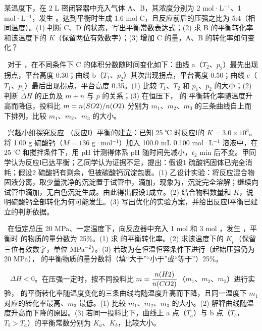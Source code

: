 \begin{xiti}
\item 某温度下，在 2 L 密闭容器中充入气体 A、B，其浓度分别为 2 mol·L$^{-1}$、1 mol·L$^{-1}$，发生 。达到平衡时生成 1.6 mol C，且反应前后的压强之比为 5:4（相同温度）。(1) 判断 C、D 的状态，写出平衡常数表达式；(2) 求 B 的平衡转化率和该温度下的 $K$（保留两位有效数字）；(3) 增加 C 的量，A、B 的转化率如何变化？

\item {}\ 对于 ，在不同条件下 C 的体积分数随时间变化如下：曲线 a（$T_2$、$p_2$）最先出现拐点，平台高度 0.30；曲线 b（$T_1$、$p_2$）其次出现拐点，平台高度 0.50；曲线 c（$T_1$、$p_1$）最后出现拐点，平台高度 0.35。(1) 比较 $T_1$、$T_2$ 和 $p_1$、$p_2$ 的大小；(2) 判断 $\Delta H$ 的正负及 $m+n$ 与 $p$ 的关系；(3) 在恒压下， 的  平衡转化率随温度升高而降低，投料比 $m=n(SO2)/n(O2)$ 分别为 $m_1$、$m_2$、$m_3$ 的三条曲线自上而下排列，比较 $m_1$、$m_2$、$m_3$ 的大小。

\item {}\ 兴趣小组探究反应 （反应Ⅰ）平衡的建立：已知 25 ℃ 时反应Ⅰ的 $K=3.0\times10^3$。将 1.00 g 硫酸钙（$M=136$ g·mol$^{-1}$）加入 100.0 mL 0.100 mol·L$^{-1}$  溶液中，在 25 ℃ 和搅拌条件下，用 pH 计测得体系 pH 随时间先减小，$t_2$ min 后不变。甲同学认为反应Ⅰ已达平衡；乙同学认为证据不足，提出：假设1 硫酸钙固体已完全消耗；假设2 硫酸钙有剩余，但被碳酸钙沉淀包裹。(1) 乙设计实验：将反应混合物固液分离，取少量洗净的沉淀置于试管中，滴加\tk，现象为\tk，沉淀完全溶解；继续向试管中滴加\tk，无白色沉淀生成。由此得出假设1成立。(2) 结合物料数量和 $K$，说明硫酸钙全部转化为何可能发生。(3) 写出优化的实验方案，并给出反应Ⅰ平衡已建立的判断依据。

\item {}\ 在恒定总压 20 MPa、一定温度下，向反应器中充入 1 mol  和 3 mol ，发生 ，平衡时  的物质的量分数为 25\%。(1) 求  的平衡转化率。(2) 求该温度下的 $K_p$（保留三位有效数字，单位 MPa$^{-2}$）。(3) 若改为在恒温恒容条件下进行（起始压强仍为 20 MPa）， 的平衡物质的量分数将\tk（填“大于”“小于”或“等于”）25\%。

\item {}\  $\Delta H<0$。在压强一定时，按不同投料比 $m=\dfrac{n(H2)}{n(CO2)}$（$m_1$、$m_2$、$m_3$）进行实验， 的平衡转化率随温度变化的三条曲线均随温度升高而下降，且同一温度下 $m_1$ 对应的转化率最高、$m_3$ 最低。(1) 比较 $m_1$、$m_2$、$m_3$ 的大小。(2) 解释曲线随温度升高而下降的原因。(3) 若同一投料比下，曲线上 a 点（$T_a$）与 b 点（$T_b$，$T_b>T_a$）的平衡常数分别为 $K_a$、$K_b$，比较大小。
\end{xiti}

